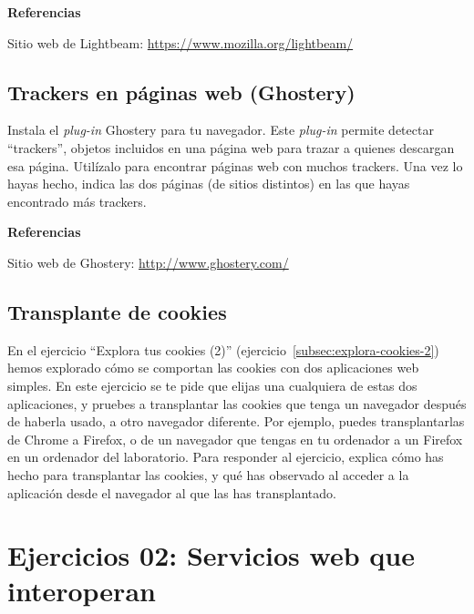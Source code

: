 \textbf{Referencias}

Sitio web de Lightbeam: \url{https://www.mozilla.org/lightbeam/}

\subsection{Trackers en páginas web (Ghostery)}
\label{subsec:trackers-paginas-web-2}

Instala el \emph{plug-in} Ghostery para tu navegador. Este \emph{plug-in} permite detectar ``trackers'', objetos incluidos en una página web para trazar a quienes descargan esa página. Utilízalo para encontrar páginas web con muchos trackers. Una vez lo hayas hecho, indica las dos páginas (de sitios distintos) en las que hayas encontrado más trackers.

\textbf{Referencias}

Sitio web de Ghostery: \url{http://www.ghostery.com/}

\subsection{Transplante de cookies}
\label{subsec:transplante-cookies}

En el ejercicio ``Explora tus cookies (2)'' (ejercicio~\ref{subsec:explora-cookies-2}) hemos explorado cómo se comportan las cookies con dos aplicaciones web simples. En este ejercicio se te pide que elijas una cualquiera de estas dos aplicaciones, y pruebes a transplantar las cookies que tenga un navegador después de haberla usado, a otro navegador diferente. Por ejemplo, puedes transplantarlas de Chrome a Firefox, o de un navegador que tengas en tu ordenador a un Firefox en un ordenador del laboratorio. Para responder al ejercicio, explica cómo has hecho para transplantar las cookies, y qué has observado al acceder a la aplicación desde el navegador al que las has transplantado.


\section{Ejercicios 02: Servicios web que interoperan}


